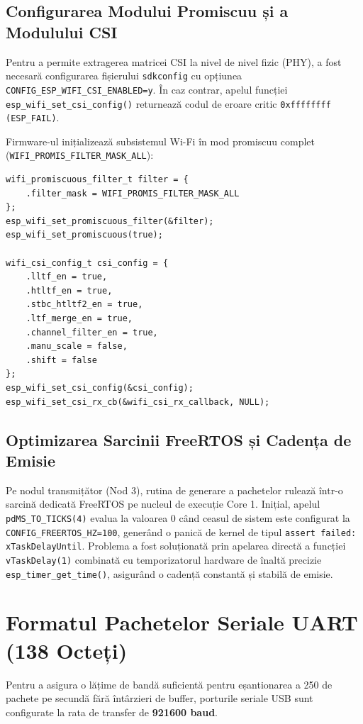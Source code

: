 \subsection{Configurarea Modului Promiscuu și a Modulului CSI}
Pentru a permite extragerea matricei CSI la nivel de nivel fizic (PHY), a fost necesară configurarea fișierului \texttt{sdkconfig} cu opțiunea \texttt{CONFIG\_ESP\_WIFI\_CSI\_ENABLED=y}. În caz contrar, apelul funcției \texttt{esp\_wifi\_set\_csi\_config()} returnează codul de eroare critic \texttt{0xffffffff (ESP\_FAIL)}.

Firmware-ul inițializează subsistemul Wi-Fi în mod promiscuu complet (\texttt{WIFI\_PROMIS\_FILTER\_MASK\_ALL}):
\begin{verbatim}
wifi_promiscuous_filter_t filter = {
    .filter_mask = WIFI_PROMIS_FILTER_MASK_ALL
};
esp_wifi_set_promiscuous_filter(&filter);
esp_wifi_set_promiscuous(true);

wifi_csi_config_t csi_config = {
    .lltf_en = true,
    .htltf_en = true,
    .stbc_htltf2_en = true,
    .ltf_merge_en = true,
    .channel_filter_en = true,
    .manu_scale = false,
    .shift = false
};
esp_wifi_set_csi_config(&csi_config);
esp_wifi_set_csi_rx_cb(&wifi_csi_rx_callback, NULL);
\end{verbatim}

\subsection{Optimizarea Sarcinii FreeRTOS și Cadența de Emisie}
Pe nodul transmițător (Nod 3), rutina de generare a pachetelor rulează într-o sarcină dedicată FreeRTOS pe nucleul de execuție Core 1. Inițial, apelul \texttt{pdMS\_TO\_TICKS(4)} evalua la valoarea 0 când ceasul de sistem este configurat la \texttt{CONFIG\_FREERTOS\_HZ=100}, generând o panică de kernel de tipul \texttt{assert failed: xTaskDelayUntil}. Problema a fost soluționată prin apelarea directă a funcției \texttt{vTaskDelay(1)} combinată cu temporizatorul hardware de înaltă precizie \texttt{esp\_timer\_get\_time()}, asigurând o cadență constantă și stabilă de emisie.

\section{Formatul Pachetelor Seriale UART (138 Octeți)}
Pentru a asigura o lățime de bandă suficientă pentru eșantionarea a 250 de pachete pe secundă fără întârzieri de buffer, porturile seriale USB sunt configurate la rata de transfer de \textbf{921600 baud}.

